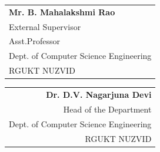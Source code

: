 \documentclass[12pt,a4paper,oneside]{report}
\begin{document}
\vspace{2cm}
\noindent
\begin{tabular}[t]{@{}l}
\textbf{Mr. B. Mahalakshmi Rao}\\External Supervisor\\Asst.Professor\\Dept. of Computer Science Engineering\\RGUKT NUZVID
\end{tabular}
\hfill
\begin{tabular}[t]{@{}r}
\textbf{Dr. D.V. Nagarjuna Devi}\\Head of the Department\\Dept. of Computer Science Engineering \\RGUKT NUZVID
\end{tabular}





\newpage
\end{document}
